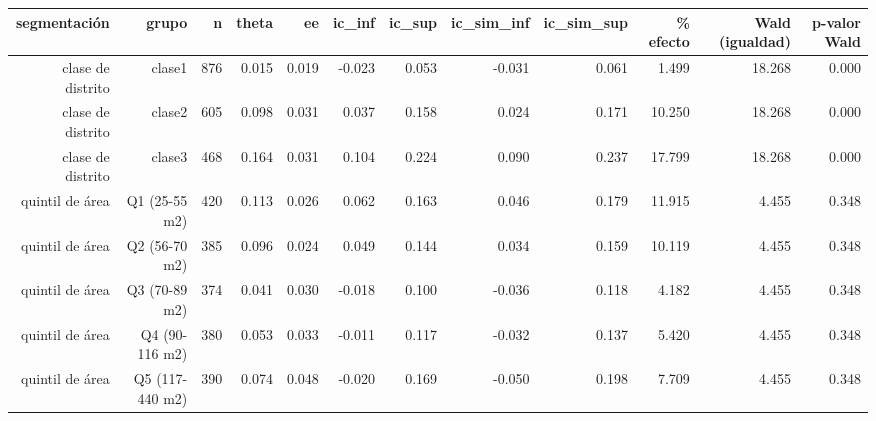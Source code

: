 \begin{tabular}{rrrrrrrrrrrr}
\toprule
segmentación & grupo & n & theta & ee & ic\_inf & ic\_sup & ic\_sim\_inf & ic\_sim\_sup & \% efecto & Wald (igualdad) & p-valor Wald \\
\midrule
clase de distrito & clase1 & 876 & 0.015 & 0.019 & -0.023 & 0.053 & -0.031 & 0.061 & 1.499 & 18.268 & 0.000 \\
clase de distrito & clase2 & 605 & 0.098 & 0.031 & 0.037 & 0.158 & 0.024 & 0.171 & 10.250 & 18.268 & 0.000 \\
clase de distrito & clase3 & 468 & 0.164 & 0.031 & 0.104 & 0.224 & 0.090 & 0.237 & 17.799 & 18.268 & 0.000 \\
quintil de área & Q1 (25-55 m2) & 420 & 0.113 & 0.026 & 0.062 & 0.163 & 0.046 & 0.179 & 11.915 & 4.455 & 0.348 \\
quintil de área & Q2 (56-70 m2) & 385 & 0.096 & 0.024 & 0.049 & 0.144 & 0.034 & 0.159 & 10.119 & 4.455 & 0.348 \\
quintil de área & Q3 (70-89 m2) & 374 & 0.041 & 0.030 & -0.018 & 0.100 & -0.036 & 0.118 & 4.182 & 4.455 & 0.348 \\
quintil de área & Q4 (90-116 m2) & 380 & 0.053 & 0.033 & -0.011 & 0.117 & -0.032 & 0.137 & 5.420 & 4.455 & 0.348 \\
quintil de área & Q5 (117-440 m2) & 390 & 0.074 & 0.048 & -0.020 & 0.169 & -0.050 & 0.198 & 7.709 & 4.455 & 0.348 \\
\bottomrule
\end{tabular}